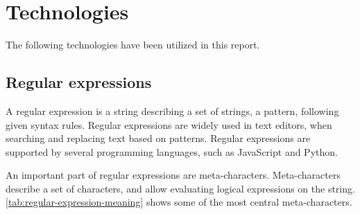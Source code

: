 \section{Technologies}

The following technologies have been utilized in this report.


\subsection{Regular expressions}

A regular expression is a string describing a set of strings, a pattern, following given syntax rules. Regular expressions are widely used in text editors, when searching and replacing text based on patterns. Regular expressions are supported by several programming languages, such as JavaScript and Python.

An important part of regular expressions are meta-characters. Meta-characters describe a set of characters, and allow evaluating logical expressions on the string. \cref{tab:regular-expression-meaning} shows some of the most central meta-characters.

